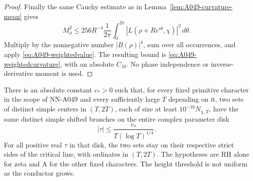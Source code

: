 \begin{proof}
Finally the same Cauchy estimate as in
Lemma~\ref{lem:A049-curvature-mean} gives
\[
 M_\rho^2\le256R^{-4}\frac1{2\pi}
       \int_0^{2\pi}|L(\rho+Re^{i\theta},\chi)|^2\,d\theta .
\]
Multiply by the nonnegative number \(|B(\rho)|^4\),
sum over all occurrences, and apply
\eqref{eq:A049-weightedvalue}. The resulting bound is
\eqref{eq:A049-weightedcurvature}, with an absolute
\(C_M\). No phase independence or inverse-derivative
moment is used.
\end{proof}

\begin{corollary}
\label{cor:A049-quarter-logarithmic}
There is an absolute constant \(c_*>0\) such that, for
every fixed primitive character in the scope of NN-A049
and every sufficiently large \(T\) depending on it,
two sets of distinct simple centers in \((T,2T)\),
each of size at least \(10^{-16}N_{\chi,T}\), have
the same distinct simple shifted branches on the entire
complex parameter disk
\[
                      |\tau|\le
                         \frac{c_*}{T(\log T)^{1/4}}.
\]
For all positive real \(\tau\) in that disk, the two sets
stay on their respective strict sides of the critical
line, with ordinates in \((T,2T)\).
The hypotheses are RH alone for zeta and A for the
other fixed characters. The height threshold is not
uniform as the conductor grows.
\end{corollary}

